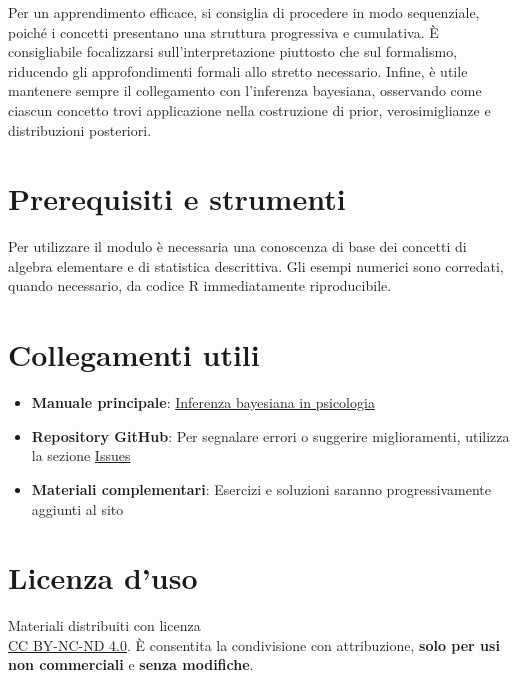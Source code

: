 \documentclass[
  italian,
  letterpaper,
  a4paper,
  11pt,
  open=any]{scrbook}
\providecommand{\tightlist}{%
  \setlength{\itemsep}{0pt}\setlength{\parskip}{0pt}}
\theoremstyle{plain}
\theoremstyle{definition}
\theoremstyle{definition}
\theoremstyle{remark}
\begin{document}

Per un apprendimento efficace, si consiglia di procedere in modo
sequenziale, poiché i concetti presentano una struttura progressiva e
cumulativa. È consigliabile focalizzarsi sull'interpretazione piuttosto
che sul formalismo, riducendo gli approfondimenti formali allo stretto
necessario. Infine, è utile mantenere sempre il collegamento con
l'inferenza bayesiana, osservando come ciascun concetto trovi
applicazione nella costruzione di prior, verosimiglianze e distribuzioni
posteriori.

\section*{Prerequisiti e strumenti}\label{prerequisiti-e-strumenti}


Per utilizzare il modulo è necessaria una conoscenza di base dei
concetti di algebra elementare e di statistica descrittiva. Gli esempi
numerici sono corredati, quando necessario, da codice R immediatamente
riproducibile.

\section*{Collegamenti utili}\label{collegamenti-utili}


\begin{itemize}
\tightlist
\item
  \textbf{Manuale principale}:
  \href{https://ccaudek.github.io/utet-companion/}{Inferenza bayesiana
  in psicologia}
\item
  \textbf{Repository GitHub}: Per segnalare errori o suggerire
  miglioramenti, utilizza la sezione
  \href{https://github.com/ccaudek/utet-prob/issues/new}{Issues}
\item
  \textbf{Materiali complementari}: Esercizi e soluzioni saranno
  progressivamente aggiunti al sito
\end{itemize}

\section*{Licenza d'uso}\label{licenza-duso}


Materiali distribuiti con licenza\\
\href{https://creativecommons.org/licenses/by-nc-nd/4.0/deed.it}{CC
BY-NC-ND 4.0}. È consentita la condivisione con attribuzione,
\textbf{solo per usi non commerciali} e \textbf{senza modifiche}.
\end{document}
